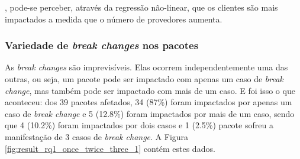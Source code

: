 , pode-se perceber, através da regressão não-linear, que os clientes são mais impactados a medida que o número de provedores aumenta.

\subsubsection{Variedade de \textit{break changes} nos pacotes}
As \textit{break changes} são imprevisíveis. Elas ocorrem independentemente uma das outras, ou seja, um pacote pode ser impactado com apenas um caso de \textit{break change}, mas também pode ser impactado com mais de um caso. E foi isso o que aconteceu: dos 39 pacotes afetados, 34 (87\%) foram impactados por apenas um caso de \textit{break change} e 5 (12.8\%) foram impactados por mais de um caso, sendo que 4 (10.2\%) foram impactados por dois casos e 1 (2.5\%) pacote sofreu a manifestação de 3 casos de \textit{break change}. A Figura \ref{fig:result_rq1_once_twice_three_1} contém estes dados.

